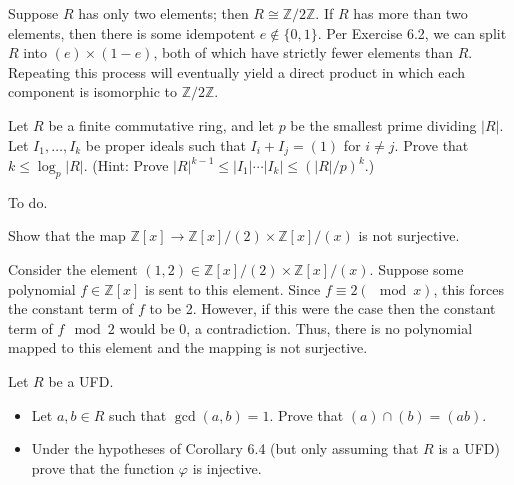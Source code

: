 \documentclass[../../master.tex]{subfiles}
\begin{document}
\begin{solution}
    Suppose $R$ has only two elements; then $R \cong \mathbb{Z} / 2\mathbb{Z}$.
    If $R$ has more than two elements, then there is some idempotent $e \notin \{0, 1\}$.
    Per Exercise 6.2, we can split $R$ into $(e) \times (1 - e)$, both of which have strictly fewer elements than $R$.
    Repeating this process will eventually yield a direct product in which each component is isomorphic to $\mathbb{Z} / 2\mathbb{Z}$.
\end{solution}

\begin{problem}
    Let $R$ be a finite commutative ring, and let $p$ be the smallest prime dividing $|R|$.
    Let $I_1, \ldots, I_k$ be proper ideals such that $I_i + I_j = (1)$ for $i \neq j$.
    Prove that $k \leq \log_p |R|$.
    (Hint: Prove $|R|^{k-1} \leq |I_1| \cdots |I_k| \leq (|R| / p)^{k}$.)
\end{problem}

\begin{solution}
    To do.
\end{solution}

\begin{problem}
    Show that the map $\mathbb{Z}[x] \to \mathbb{Z}[x] / (2) \times \mathbb{Z}[x] / (x)$ is not surjective.
\end{problem}

\begin{solution}
    Consider the element $(1, 2) \in \mathbb{Z}[x] / (2) \times \mathbb{Z}[x] / (x)$.
    Suppose some polynomial $f \in \mathbb{Z}[x]$ is sent to this element.
    Since $f \equiv 2 (\mod x)$, this forces the constant term of $f$ to be 2.
    However, if this were the case then the constant term of $f \mod 2$ would be 0, a contradiction.
    Thus, there is no polynomial mapped to this element and the mapping is not surjective.
\end{solution}

\begin{problem}
    Let $R$ be a UFD.
    \begin{itemize}
        \item Let $a, b \in R$ such that $\gcd(a, b) = 1$.
            Prove that $(a) \cap (b) = (ab)$.
        \item Under the hypotheses of Corollary 6.4 (but only assuming that $R$ is a UFD) prove that the function $\varphi$ is injective.
    \end{itemize}
\end{problem}
\end{document}
